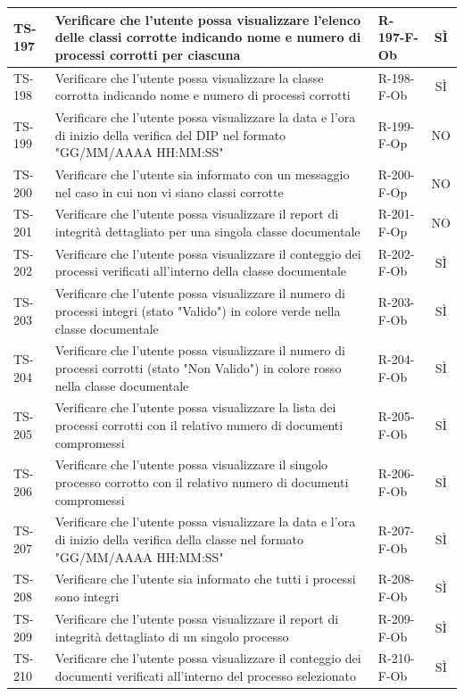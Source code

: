 \documentclass[a4paper,12pt]{article}
\begin{document}
\begin{longtable}{|p{1.5cm}|p{8.3cm}|p{2.4cm}|c|}
\hline
TS-197 & Verificare che l'utente possa visualizzare l'elenco delle classi corrotte indicando nome e numero di processi corrotti per ciascuna & R-197-F-Ob & SÌ \\
\hline
TS-198 & Verificare che l'utente possa visualizzare la classe corrotta indicando nome e numero di processi corrotti & R-198-F-Ob & SÌ \\
\hline
TS-199 & Verificare che l'utente possa visualizzare la data e l'ora di inizio della verifica del DIP nel formato "GG/MM/AAAA HH:MM:SS" & R-199-F-Op & NO \\
\hline
TS-200 & Verificare che l'utente sia informato con un messaggio nel caso in cui non vi siano classi corrotte & R-200-F-Op & NO \\
\hline
TS-201 & Verificare che l'utente possa visualizzare il report di integrità dettagliato per una singola classe documentale & R-201-F-Op & NO \\
\hline
TS-202 & Verificare che l'utente possa visualizzare il conteggio dei processi verificati all'interno della classe documentale & R-202-F-Ob & SÌ \\
\hline
TS-203 & Verificare che l'utente possa visualizzare il numero di processi integri (stato "Valido") in colore verde nella classe documentale & R-203-F-Ob & SÌ \\
\hline
TS-204 & Verificare che l'utente possa visualizzare il numero di processi corrotti (stato "Non Valido") in colore rosso nella classe documentale & R-204-F-Ob & SÌ \\
\hline
TS-205 & Verificare che l'utente possa visualizzare la lista dei processi corrotti con il relativo numero di documenti compromessi & R-205-F-Ob & SÌ \\
\hline
TS-206 & Verificare che l'utente possa visualizzare il singolo processo corrotto con il relativo numero di documenti compromessi & R-206-F-Ob & SÌ \\
\hline
TS-207 & Verificare che l'utente possa visualizzare la data e l'ora di inizio della verifica della classe nel formato "GG/MM/AAAA HH:MM:SS" & R-207-F-Ob & SÌ \\
\hline
TS-208 & Verificare che l'utente sia informato che tutti i processi sono integri & R-208-F-Ob & SÌ \\
\hline
TS-209 & Verificare che l'utente possa visualizzare il report di integrità dettagliato di un singolo processo & R-209-F-Ob & SÌ \\
\hline
TS-210 & Verificare che l'utente possa visualizzare il conteggio dei documenti verificati all'interno del processo selezionato & R-210-F-Ob & SÌ \\

\end{longtable}
\end{document}
